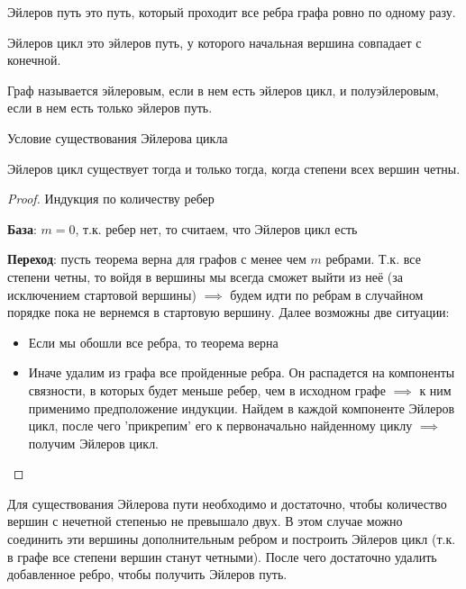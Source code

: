 
\begin{definition}
  Эйлеров путь это путь, который проходит все ребра графа ровно по одному разу.
\end{definition}

\begin{definition}
  Эйлеров цикл это эйлеров путь, у которого начальная вершина совпадает с
  конечной.
\end{definition}

\begin{definition}
  Граф называется эйлеровым, если в нем есть эйлеров цикл, и полуэйлеровым, если
  в нем есть только эйлеров путь.
\end{definition}

\begin{theorem}
  Условие существования Эйлерова цикла

  Эйлеров цикл существует тогда и только тогда, когда степени всех вершин четны.  
\end{theorem}
\begin{proof}
  Индукция по количеству ребер

  \textbf{База}: \(m = 0\), т.к. ребер нет, то считаем, что Эйлеров цикл есть

  \textbf{Переход}: пусть теорема верна для графов с менее чем \(m\) ребрами.
  Т.к. все степени четны, то войдя в вершины мы всегда сможет выйти из неё (за
  исключением стартовой вершины) \(\implies\) будем идти по ребрам в случайном
  порядке пока не вернемся в стартовую вершину. Далее возможны две ситуации:

  \begin{itemize}
    \item Если мы обошли все ребра, то теорема верна
    \item Иначе удалим из графа все пройденные ребра. Он распадется на
    компоненты связности, в которых будет меньше ребер, чем в исходном графе
    \(\implies\) к ним применимо предположение индукции. Найдем в каждой
    компоненте Эйлеров цикл, после чего 'прикрепим' его к первоначально
    найденному циклу \(\implies\) получим Эйлеров цикл.
  \end{itemize}
\end{proof}

\begin{remark}
  Для существования Эйлерова пути необходимо и достаточно, чтобы количество
  вершин с нечетной степенью не превышало двух. В этом случае можно соединить
  эти вершины дополнительным ребром и построить Эйлеров цикл (т.к. в графе все
  степени вершин станут четными). После чего достаточно удалить добавленное
  ребро, чтобы получить Эйлеров путь.
\end{remark}
